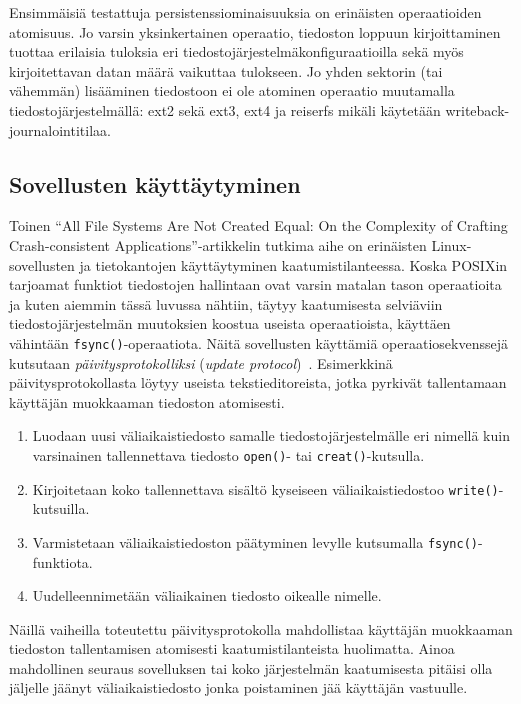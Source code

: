 Ensimmäisiä testattuja persistenssiominaisuuksia on erinäisten operaatioiden atomisuus.
Jo varsin yksinkertainen operaatio, tiedoston loppuun kirjoittaminen tuottaa erilaisia tuloksia eri tiedostojärjestelmäkonfiguraatioilla
sekä myös kirjoitettavan datan määrä vaikuttaa tulokseen.
Jo yhden sektorin (tai vähemmän) lisääminen tiedostoon ei ole atominen operaatio muutamalla tiedostojärjestelmällä: ext2 sekä
ext3, ext4 ja reiserfs mikäli käytetään writeback-journalointitilaa.

\subsection{Sovellusten käyttäytyminen}

Toinen ``All File Systems Are Not Created Equal: On the Complexity of Crafting Crash-consistent Applications''-artikkelin tutkima aihe on erinäisten Linux-sovellusten ja tietokantojen käyttäytyminen kaatumistilanteessa.
Koska POSIXin tarjoamat funktiot tiedostojen hallintaan ovat varsin matalan tason operaatioita ja kuten aiemmin tässä luvussa nähtiin,
täytyy kaatumisesta selviäviin tiedostojärjestelmän muutoksien koostua useista operaatioista, käyttäen vähintään \texttt{fsync()}-operaatiota.
Näitä sovellusten käyttämiä operaatiosekvenssejä kutsutaan \emph{päivitysprotokolliksi} (\emph{update protocol})~\cite{PosixDataConsistency}.
Esimerkkinä päivitysprotokollasta löytyy useista tekstieditoreista, jotka pyrkivät tallentamaan käyttäjän muokkaaman tiedoston atomisesti.
\begin{enumerate}
    \item{Luodaan uusi väliaikaistiedosto samalle tiedostojärjestelmälle eri nimellä kuin varsinainen tallennettava tiedosto \texttt{open()}- tai \texttt{creat()}-kutsulla.}
    \item{Kirjoitetaan koko tallennettava sisältö kyseiseen väliaikaistiedostoo \texttt{write()}-kutsuilla.}
    \item{Varmistetaan väliaikaistiedoston päätyminen levylle kutsumalla \texttt{fsync()}-funktiota.}
    \item{Uudelleennimetään väliaikainen tiedosto oikealle nimelle.}
\end{enumerate}
Näillä vaiheilla toteutettu päivitysprotokolla mahdollistaa käyttäjän muokkaaman tiedoston tallentamisen atomisesti kaatumistilanteista huolimatta.
Ainoa mahdollinen seuraus sovelluksen tai koko järjestelmän kaatumisesta pitäisi olla jäljelle jäänyt väliaikaistiedosto jonka poistaminen jää käyttäjän vastuulle.

